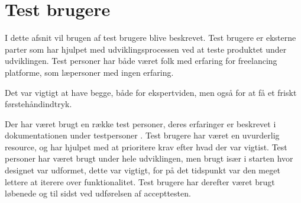 \chapter{Test brugere}

I dette afsnit vil brugen af test brugere blive beskrevet. Test brugere er eksterne parter som har hjulpet med udviklingsprocessen ved at teste produktet under udviklingen. Test personer har både været folk med erfaring for freelancing platforme, som læpersoner med ingen erfaring. 

Det var vigtigt at have begge, både for ekspertviden, men også for at få et friskt førstehåndindtryk.

Der har været brugt en række test personer, deres erfaringer er beskrevet i dokumentationen under testpersoner . Test brugere har været en uvurderlig resource, og har hjulpet med at prioritere krav efter hvad der var vigtist. Test personer har været brugt under hele udviklingen, men brugt især i starten hvor designet var udformet, dette var vigtigt, for på det tidspunkt var den meget lettere at iterere over funktionalitet. Test brugere har derefter været brugt løbenede og til sidst ved udførelsen af accepttesten.

